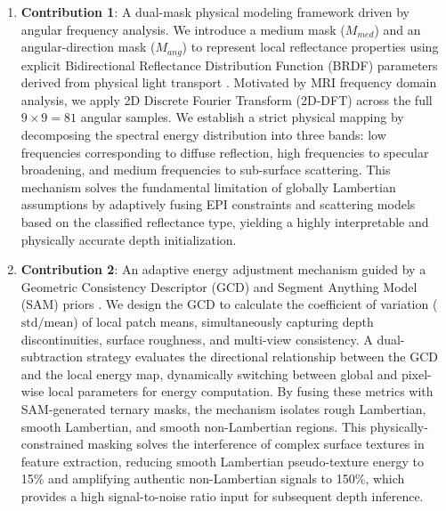 \documentclass[lettersize,journal]{IEEEtran}
\begin{document}
\begin{enumerate}
    \item \textbf{Contribution 1}: A dual-mask physical modeling framework driven by angular frequency analysis. We introduce a medium mask ($M_{med}$) and an angular-direction mask ($M_{ang}$) to represent local reflectance properties using explicit Bidirectional Reflectance Distribution Function (BRDF) parameters derived from physical light transport \cite{blinn1977}. Motivated by MRI frequency domain analysis, we apply 2D Discrete Fourier Transform (2D-DFT) across the full $9 \times 9 = 81$ angular samples. We establish a strict physical mapping by decomposing the spectral energy distribution into three bands: low frequencies corresponding to diffuse reflection, high frequencies to specular broadening, and medium frequencies to sub-surface scattering. This mechanism solves the fundamental limitation of globally Lambertian assumptions by adaptively fusing EPI constraints and scattering models based on the classified reflectance type, yielding a highly interpretable and physically accurate depth initialization.

    \item \textbf{Contribution 2}: An adaptive energy adjustment mechanism guided by a Geometric Consistency Descriptor (GCD) and Segment Anything Model (SAM) priors \cite{kirillov2023}. We design the GCD to calculate the coefficient of variation ($\text{std}/\text{mean}$) of local patch means, simultaneously capturing depth discontinuities, surface roughness, and multi-view consistency. A dual-subtraction strategy evaluates the directional relationship between the GCD and the local energy map, dynamically switching between global and pixel-wise local parameters for energy computation. By fusing these metrics with SAM-generated ternary masks, the mechanism isolates rough Lambertian, smooth Lambertian, and smooth non-Lambertian regions. This physically-constrained masking solves the interference of complex surface textures in feature extraction, reducing smooth Lambertian pseudo-texture energy to 15\% and amplifying authentic non-Lambertian signals to 150\%, which provides a high signal-to-noise ratio input for subsequent depth inference.


\end{enumerate}
\end{document}
